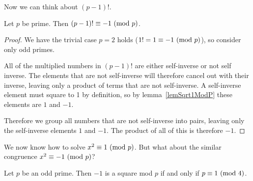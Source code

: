 \documentclass[../Main.tex]{subfiles}
\begin{document}
Now we can think about $(p-1)!$.
\begin{theorem}
    Let $p$ be prime. Then $(p-1)! \equiv -1~(\text{mod}~{p})$.
    \label{thmFactorialPMinusOne}
\end{theorem}
\begin{proof}
    We have the trivial case $p = 2$ holds ($1! = 1 \equiv -1~(\text{mod}~{p})$), so consider only odd primes.\par
    All of the multiplied numbers in $(p-1)!$ are either self-inverse or not self inverse. The elements that are not self-inverse will therefore cancel out with their inverse, leaving only a product of terms that are not self-inverse. A self-inverse element must square to 1 by definition, so by lemma~\ref{lemSqrt1ModP} these elements are $1$ and $-1$.\par
    Therefore we group all numbers that are not self-inverse into pairs, leaving only the self-inverse elements $1$ and $-1$. The product of all of this is therefore $-1$.
\end{proof}
We now know how to solve $x^2 \equiv 1~(\text{mod}~{p})$. But what about the similar congruence $x^2 \equiv -1~(\text{mod}~{p})$?
\begin{proposition}
    Let $p$ be an odd prime. Then $-1$ is a square mod $p$ if and only if $p \equiv 1~(\text{mod}~{4})$.\label{propMinusOneModP}
\end{proposition}
\end{document}
